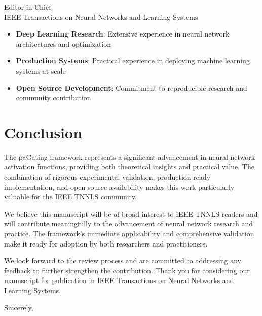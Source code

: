 \documentclass[11pt]{letter}
\begin{document}
\begin{letter}{Editor-in-Chief\\
IEEE Transactions on Neural Networks and Learning Systems}
\begin{itemize}
    \item \textbf{Deep Learning Research}: Extensive experience in neural network architectures and optimization
    \item \textbf{Production Systems}: Practical experience in deploying machine learning systems at scale
    \item \textbf{Open Source Development}: Commitment to reproducible research and community contribution
\end{itemize}

\section*{Conclusion}

The paGating framework represents a significant advancement in neural network activation functions, providing both theoretical insights and practical value. The combination of rigorous experimental validation, production-ready implementation, and open-source availability makes this work particularly valuable for the IEEE TNNLS community.

We believe this manuscript will be of broad interest to IEEE TNNLS readers and will contribute meaningfully to the advancement of neural network research and practice. The framework's immediate applicability and comprehensive validation make it ready for adoption by both researchers and practitioners.

We look forward to the review process and are committed to addressing any feedback to further strengthen the contribution. Thank you for considering our manuscript for publication in IEEE Transactions on Neural Networks and Learning Systems.

\closing{Sincerely,}

\end{letter}
\end{document}
